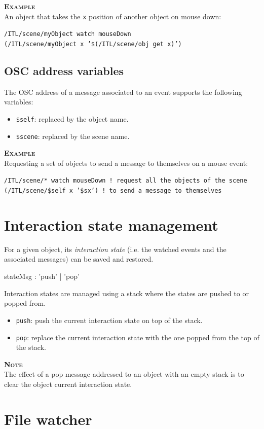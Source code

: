 \documentclass[a4paper,twoside]{report}
\newcommand{\sublevel}[1]	{\section{#1}}
\newcommand{\subsublevel}[1]	{\subsection{#1}}
\newcommand{\OSC}[1]		{\texttt{#1}}
\newcommand{\values}[1]	{\texttt{#1}}
\newcommand{\example}		{\textbf{\hspace{-1.5cm}\textbf{\textsc{Example }}}}
\newcommand{\note}	[1]		{\vspace{2mm}\textbf{\hspace{-1.03cm}\textbf{\textsc{Note #1}}}}
\newcommand{\sample}	[1]			{\vspace{-2mm}\begin{center}\colorbox{mygrey}{
								\begin{minipage}[t]{0.9\columnwidth} 
								{\small \texttt{#1}}
								\end{minipage}}\end{center}}
\begin{document}
\example \\
An object that takes the \values{x} position of another object on mouse down:
\sample{/ITL/scene/myObject watch mouseDown \\
\hspace*{3cm}(/ITL/scene/myObject x '\$(/ITL/scene/obj get x)')}


\subsublevel{OSC address variables}
\label{oscvar}
The OSC address of a message associated to an event supports the following variables:
\begin{itemize}
\item \OSC{\$self}: replaced by the object name.
\item \OSC{\$scene}: replaced by the scene name.
\end{itemize}

\example \\
Requesting a set of objects to send a message to themselves on a mouse event:
\sample{/ITL/scene/* watch mouseDown \hspace*{2.4cm}! request all the objects of the scene \\
\hspace*{2.7cm}(/ITL/scene/\$self x '\$sx') ! to send a message to themselves
}

\sublevel{Interaction state management}
\label{evtstate}

For a given object, its \emph{interaction state} (i.e. the watched events and the associated messages) can be saved and restored.
\begin{rail} 
stateMsg : 'push' | 'pop'
\end{rail}

Interaction states are managed using a stack where the states are pushed to or popped from.
\begin{itemize}
\item \OSC{push}: push the current interaction state on top of the stack.
\item \OSC{pop}: replace the current interaction state with the one popped from the top of the stack.
\end{itemize}

\note{} \\
The effect of a pop message addressed to an object with an empty stack is to clear the object current interaction state.


\sublevel{File watcher}
\label{filewatch}
\end{document}
